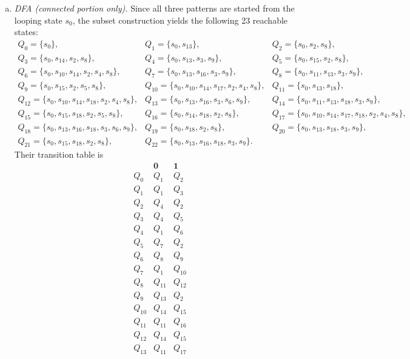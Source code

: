 \begin{enumerate}[{4.}1.]
\begin{enumerate}[(a)]
  \item \emph{DFA (connected portion only).}  Since all three patterns are
  started from the looping state $s_0$, the subset construction yields the
  following 23 reachable states:
  \[
  \begin{array}{lll}
  Q_0=\{s_0\}, &
  Q_1=\{s_0,s_{13}\}, &
  Q_2=\{s_0,s_2,s_8\},\\
  Q_3=\{s_0,s_{14},s_2,s_8\}, &
  Q_4=\{s_0,s_{13},s_3,s_9\}, &
  Q_5=\{s_0,s_{15},s_2,s_8\},\\
  Q_6=\{s_0,s_{10},s_{14},s_2,s_4,s_8\}, &
  Q_7=\{s_0,s_{13},s_{16},s_3,s_9\}, &
  Q_8=\{s_0,s_{11},s_{13},s_3,s_9\},\\
  Q_9=\{s_0,s_{15},s_2,s_5,s_8\}, &
  Q_{10}=\{s_0,s_{10},s_{14},s_{17},s_2,s_4,s_8\}, &
  Q_{11}=\{s_0,s_{13},s_{18}\},\\
  Q_{12}=\{s_0,s_{10},s_{14},s_{18},s_2,s_4,s_8\}, &
  Q_{13}=\{s_0,s_{13},s_{16},s_3,s_6,s_9\}, &
  Q_{14}=\{s_0,s_{11},s_{13},s_{18},s_3,s_9\},\\
  Q_{15}=\{s_0,s_{15},s_{18},s_2,s_5,s_8\}, &
  Q_{16}=\{s_0,s_{14},s_{18},s_2,s_8\}, &
  Q_{17}=\{s_0,s_{10},s_{14},s_{17},s_{18},s_2,s_4,s_8\},\\
  Q_{18}=\{s_0,s_{13},s_{16},s_{18},s_3,s_6,s_9\}, &
  Q_{19}=\{s_0,s_{18},s_2,s_8\}, &
  Q_{20}=\{s_0,s_{13},s_{18},s_3,s_9\},\\
  Q_{21}=\{s_0,s_{15},s_{18},s_2,s_8\}, &
  Q_{22}=\{s_0,s_{13},s_{16},s_{18},s_3,s_9\}. &
  \end{array}
  \]
  Their transition table is
  \[
  \begin{array}{c|cc}
   & \pmb{0} & \pmb{1}\\\hline
  Q_0 & Q_1 & Q_2\\
  Q_1 & Q_1 & Q_3\\
  Q_2 & Q_4 & Q_2\\
  Q_3 & Q_4 & Q_5\\
  Q_4 & Q_1 & Q_6\\
  Q_5 & Q_7 & Q_2\\
  Q_6 & Q_8 & Q_9\\
  Q_7 & Q_1 & Q_{10}\\
  Q_8 & Q_{11} & Q_{12}\\
  Q_9 & Q_{13} & Q_2\\
  Q_{10} & Q_{14} & Q_{15}\\
  Q_{11} & Q_{11} & Q_{16}\\
  Q_{12} & Q_{14} & Q_{15}\\
  Q_{13} & Q_{11} & Q_{17}\\

\end{array}\]
\end{enumerate}
\end{enumerate}
